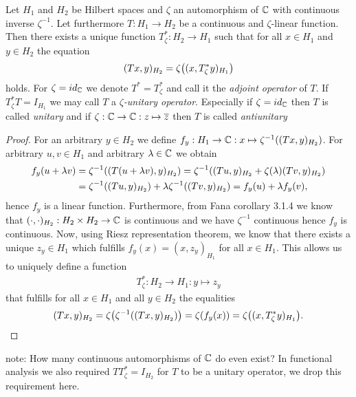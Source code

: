 \begin{lemma}
	Let $H_1$ and $H_2$ be Hilbert spaces and $\zeta$ an automorphism of $\mathbb{C}$ with continuous inverse $\zeta^{-1}$. Let furthermore $T: H_1 \to H_2$ be a continuous and $\zeta$-linear function. Then there exists a unique function $T_\zeta^\ast: H_2 \to H_1$ such that for all $x \in H_1$ and $y \in H_2$ the equation 
	\begin{align*}
		(Tx, y)_{H_2} = \zeta{\left ( (x, T_\zeta^\ast y)_{H_1} \right )}
	\end{align*}
	holds. For $\zeta = id_{\mathbb{C}}$ we denote $T^\ast = T_\zeta^\ast$ and call it the \textit{adjoint operator} of $T$. If $T_\zeta^\ast T = I_{H_1}$ we may call $T$ a $\zeta$\textit{-unitary operator}. Especially if $\zeta = id_{\mathbb{C}}$ then $T$ is called \textit{unitary} and if $\zeta: \mathbb{C} \to \mathbb{C}: z \mapsto \overline{z}$ then $T$ is called \textit{antiunitary}
\end{lemma}

\begin{proof}
	For an arbitrary $y \in H_2$ we define $f_y: H_1 \to \mathbb{C}: x \mapsto \zeta^{-1}{\left ( (Tx,y)_{H_2} \right )}$. For arbitrary $u,v \in H_1$ and arbitrary $\lambda \in \mathbb{C}$ we obtain
	\begin{align*}
		f_y(u + \lambda v) &= \zeta^{-1}{\left ( (T(u + \lambda v), y)_{H_2} \right )} = \zeta^{-1}{\left ( (Tu, y)_{H_2} + \zeta(\lambda) (Tv, y)_{H_2} \right )} \\
		&= \zeta^{-1}{\left ( (Tu,y)_{H_2} \right )} + \lambda \zeta^{-1}{\left ( (Tv,y)_{H_2} \right )} = f_y(u) + \lambda f_y(v),
	\end{align*}
	hence $f_y$ is a linear function. Furthermore, from Fana corollary 3.1.4 we know that $(\cdot, \cdot)_{H_2}: H_2 \times H_2 \to \mathbb{C}$ is continuous and we have $\zeta^{-1}$ continuous hence $f_y$ is continuous. Now, using Riesz representation theorem, we know that there exists a unique $z_y \in H_1$ which fulfills $f_y(x) = (x,z_y)_{H_1}$ for all $x \in H_1$. This allows us to uniquely define a function
	\begin{align*}
		T_\zeta^\ast: H_2 \to H_1: y \mapsto z_y
	\end{align*}
	that fulfills for all $x \in H_1$ and all $y \in H_2$ the equalities
	\begin{align*}
		(Tx,y)_{H_2} = \zeta{\left ( \zeta^{-1}{\left ( (Tx,y)_{H_2} \right )} \right )} = \zeta{\left ( f_y(x) \right )} = \zeta {\left ( (x, T_\zeta^\ast y)_{H_1} \right )}.
	\end{align*}
\end{proof}

note: How many continuous automorphisms of $\mathbb{C}$ do even exist? In functional analysis we also required $T T_\zeta^\ast = I_{H_2}$ for $T$ to be a unitary operator, we drop this requirement here.


